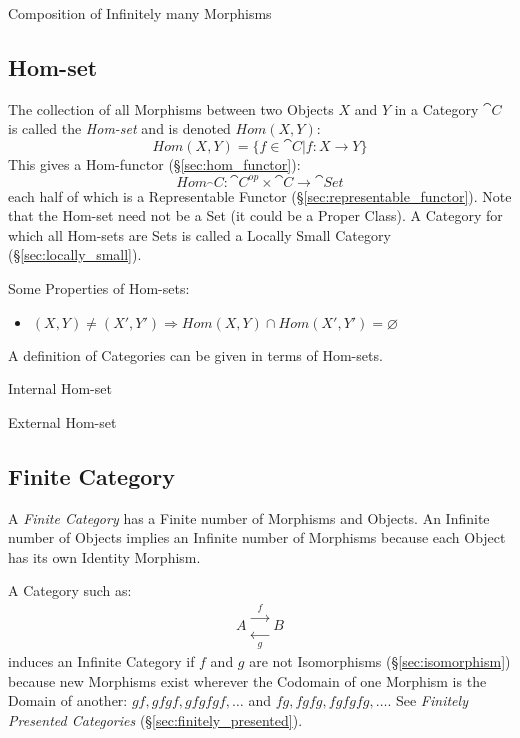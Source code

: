Composition of Infinitely many Morphisms



\subsection{Hom-set}\label{sec:hom_set}

The collection of all Morphisms between two Objects $X$ and $Y$ in a
Category $\cat{C}$ is called the \emph{Hom-set} and is denoted
$Hom(X,Y)$:
\[
  Hom(X,Y) = \{f \in \cat{C} | f : X \rightarrow Y\}
\]
This gives a Hom-functor (\S\ref{sec:hom_functor}):
\[
  Hom_\cat{C} : \cat{C^{op}} \times \cat{C} \rightarrow \cat{Set}
\]
each half of which is a Representable Functor
(\S\ref{sec:representable_functor}).
\newline
\fist Note that the Hom-set need not be a Set (it could be a
Proper Class). A Category for which all Hom-sets are Sets is called a
Locally Small Category (\S\ref{sec:locally_small}).

Some Properties of Hom-sets:
\begin{itemize}
\item $ (X,Y) \neq (X',Y') \Rightarrow
  Hom(X,Y) \cap Hom(X',Y') = \varnothing$
\end{itemize}

A definition of Categories can be given in terms of Hom-sets. %

Internal Hom-set

External Hom-set



\subsection{Finite Category}\label{sec:finite_category}

A \emph{Finite Category} has a Finite number of Morphisms and Objects.
An Infinite number of Objects implies an Infinite number of Morphisms
because each Object has its own Identity Morphism.

A Category such as:
\[
  A
  \begin{matrix}
  \xrightarrow{\;\;f\;\;}\\
  \xleftarrow[\;\;g\;\;]{}
  \end{matrix}
  B
\]
induces an Infinite Category if $f$ and $g$ are not Isomorphisms
(\S\ref{sec:isomorphism}) because new Morphisms exist wherever the
Codomain of one Morphism is the Domain of another: $gf, gfgf, gfgfgf,
\ldots$ and $fg, fgfg, fgfgfg, \ldots$. See \emph{Finitely Presented
  Categories} (\S\ref{sec:finitely_presented}).

